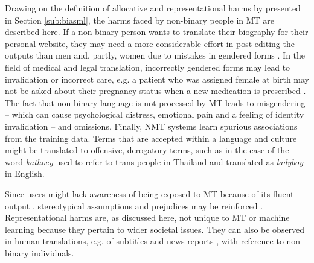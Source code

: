 Drawing on the definition of allocative and representational harms by \textcite{crawford2017keynote} presented in Section \ref{sub:biasml}, the harms faced by non-binary people in MT are described here. If a non-binary person wants to translate their biography for their personal website, they may need a more considerable effort in post-editing the outputs than men and, partly, women due to mistakes in gendered forms \citep{savoldi2021gender}. In the field of medical and legal translation, incorrectly gendered forms may lead to invalidation or incorrect care, e.g. a patient who was assigned female at birth may not be asked about their pregnancy status when a new medication is prescribed \citep{dev-etal-2021-harms}. The fact that non-binary language is not processed by MT leads to misgendering -- which can cause psychological distress, emotional pain and a feeling of identity invalidation \citep{matsuno2017non,Zimman2019soclang} -- and omissions. Finally, NMT systems learn spurious associations from the training data. Terms that are accepted within a language and culture might be translated to offensive, derogatory terms, such as in the case of the word \textit{kathoey} used to refer to trans people in Thailand and translated as \textit{ladyboy} in English. 

Since users might lack awareness of being exposed to MT because of its fluent output \citep{martindale2018fluency}, stereotypical assumptions and prejudices may be reinforced \citep{levesque2011sex,regner2019committees}. Representational harms are, as discussed here, not unique to MT or machine learning because they pertain to wider societal issues. They can also be observed in human translations, e.g. of subtitles \citep{misiek2020misgendered} and news reports \citep{lardellitranslating}, with reference to non-binary individuals. 



